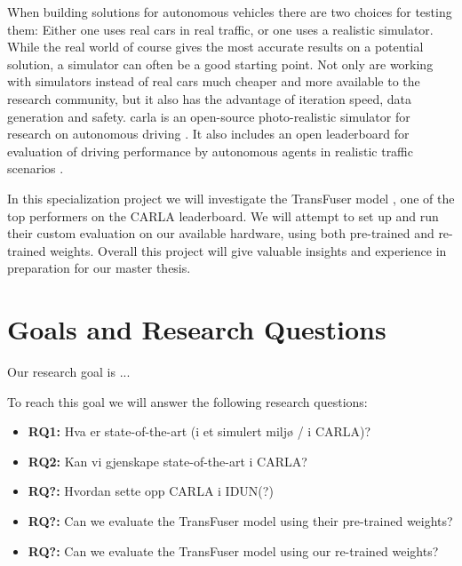 

When building solutions for autonomous vehicles there are two choices for testing them: Either one uses real cars in real traffic, or one uses a realistic simulator. While the real world of course gives the most accurate results on a potential solution, a simulator can often be a good starting point. Not only are working with simulators instead of real cars much cheaper and more available to the research community, but it also has the advantage of iteration speed, data generation and safety. \acrfull{carla} is an open-source photo-realistic simulator for research on autonomous driving \cite{introducing-carla-paper}. It also includes an open leaderboard for evaluation of driving performance by autonomous agents in realistic traffic scenarios \cite{carla-leaderboard}.  

In this specialization project we will investigate the TransFuser model \cite{transfuser-pami}, one of the top performers on the CARLA leaderboard. We will attempt to set up and run their custom evaluation on our available hardware, using both pre-trained and re-trained weights. Overall this project will give valuable insights and experience in preparation for our master thesis.


\begin{comment}
    
- How (connected) autonomous driving can mitigate traffic congestion, road safety, inefficient fuel consumption, etc. \cite{towards-connected-autonomous-driving}
- Mention why it is useful to experiment in a simulator? 
 --- Safety, easier to generate data, etc.

\end{comment}



\section{Goals and Research Questions}
Our research goal is ...

To reach this goal we will answer the following research questions:
\begin{itemize}
    \item \textbf{RQ1:} Hva er state-of-the-art (i et simulert miljø / i CARLA)?
    \item \textbf{RQ2:} Kan vi gjenskape state-of-the-art i CARLA?
    \item \textbf{RQ?:} Hvordan sette opp CARLA i IDUN(?)
    \item \textbf{RQ?:} Can we evaluate the TransFuser model using their pre-trained weights?
    \item \textbf{RQ?:} Can we evaluate the TransFuser model using our re-trained weights?
\end{itemize}


